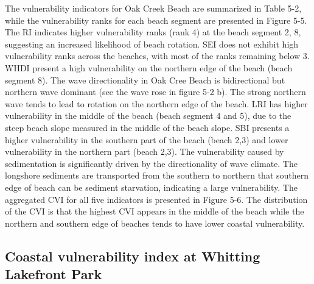The vulnerability indicators for Oak Creek Beach are summarized in Table 5-2,
while the vulnerability ranks for each beach segment are presented in Figure
5-5. The RI indicates higher vulnerability ranks (rank 4) at the beach segment
2, 8, suggesting an increased likelihood of beach rotation. SEI does not exhibit
high vulnerability ranks across the beaches, with most of the ranks remaining
below 3. WHDI present a high vulnerability on the northern edge of the beach
(beach segment 8). The wave directionality in Oak Cree Beach is bidirectional
but northern wave dominant (see the wave rose in figure 5-2 b). The strong
northern wave tends to lead to rotation on the northern edge of the beach. LRI
has higher vulnerability in the middle of the beach (beach segment 4 and 5), due
to the steep beach slope measured in the middle of the beach slope. SBI presents
a higher vulnerability in the southern part of the beach (beach 2,3) and lower
vulnerability in the northern part (beach 2,3). The vulnerability caused by
sedimentation is significantly driven by the directionality of wave climate. The
longshore sediments are transported from the southern to northern that southern
edge of beach can be sediment starvation, indicating a large vulnerability. The
aggregated CVI for all five indicators is presented in Figure 5-6. The
distribution of the CVI is that the highest CVI appears in the middle of the
beach while the northern and southern edge of beaches tends to have lower
coastal vulnerability.

\subsection{Coastal vulnerability index at Whitting Lakefront Park}
\label{Coastal vulnerability index at Whitting Lakefront Park}

